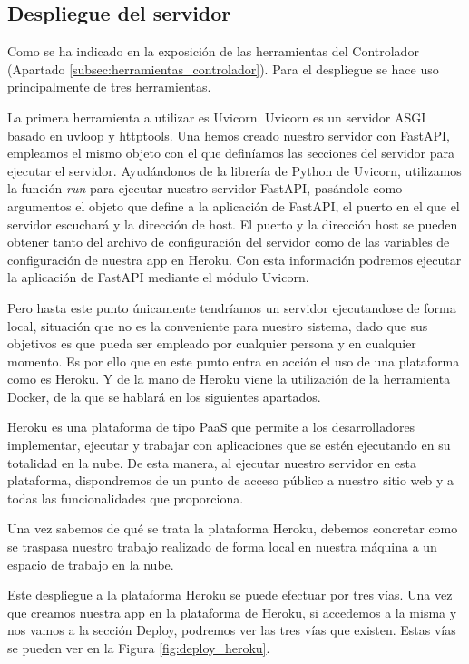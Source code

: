 \subsection{Despliegue del servidor} \label{subsec:despl_servidor_heroku}

Como se ha indicado en la exposición de las herramientas del Controlador (Apartado \ref{subsec:herramientas_controlador}). Para el despliegue se hace uso principalmente de tres herramientas.

La primera herramienta a utilizar es Uvicorn. Uvicorn es un servidor ASGI basado en uvloop y httptools. Una hemos creado nuestro servidor con FastAPI, empleamos el mismo objeto con el que definíamos las secciones del servidor para ejecutar el servidor. Ayudándonos de la librería de Python de Uvicorn, utilizamos la función \textit{run} para ejecutar nuestro servidor FastAPI, pasándole como argumentos el objeto que define a la aplicación de FastAPI, el puerto en el que el servidor escuchará y la dirección de host. El puerto y la dirección host se pueden obtener tanto del archivo de configuración del servidor como de las variables de configuración de nuestra app en Heroku. Con esta información podremos ejecutar la aplicación de FastAPI mediante el módulo Uvicorn.

Pero hasta este punto únicamente tendríamos un servidor ejecutandose de forma local, situación que no es la conveniente para nuestro sistema, dado que sus objetivos es que pueda ser empleado por cualquier persona y en cualquier momento. Es por ello que en este punto entra en acción el uso de una plataforma como es Heroku. Y de la mano de Heroku viene la utilización de la herramienta Docker, de la que se hablará en los siguientes apartados.

Heroku es una plataforma de tipo PaaS que permite a los desarrolladores implementar, ejecutar y trabajar con aplicaciones que se estén ejecutando en su totalidad en la nube. De esta manera, al ejecutar nuestro servidor en esta plataforma, dispondremos de un punto de acceso público a nuestro sitio web y a todas las funcionalidades que proporciona.

Una vez sabemos de qué se trata la plataforma Heroku, debemos concretar como se traspasa nuestro trabajo realizado de forma local en nuestra máquina a un espacio de trabajo en la nube.

Este despliegue a la plataforma Heroku se puede efectuar por tres vías. Una vez que creamos nuestra app en la plataforma de Heroku, si accedemos a la misma y nos vamos a la sección Deploy, podremos ver las tres vías que existen. Estas vías se pueden ver en la Figura \ref{fig:deploy_heroku}.

